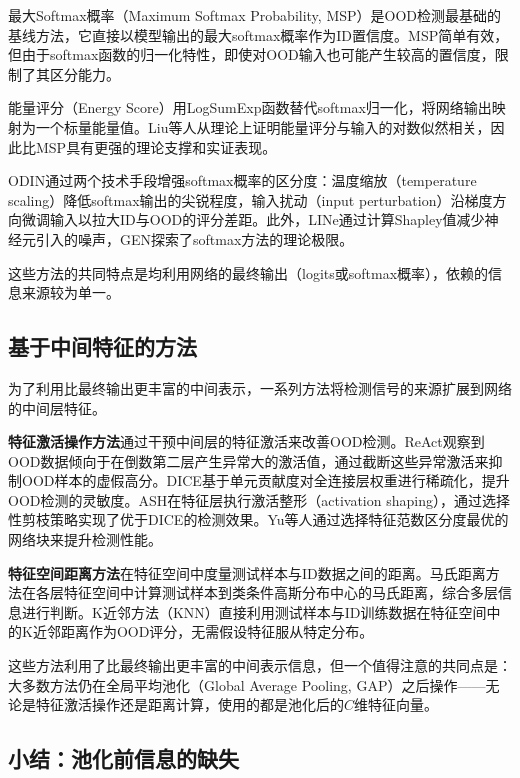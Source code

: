 最大Softmax概率（Maximum Softmax Probability, MSP）\cite{hendrycks2016msp}是OOD检测最基础的基线方法，它直接以模型输出的最大softmax概率作为ID置信度。MSP简单有效，但由于softmax函数的归一化特性，即使对OOD输入也可能产生较高的置信度，限制了其区分能力。

能量评分（Energy Score）\cite{liu2020energy}用LogSumExp函数替代softmax归一化，将网络输出映射为一个标量能量值。Liu等人\cite{liu2020energy}从理论上证明能量评分与输入的对数似然相关，因此比MSP具有更强的理论支撑和实证表现。

ODIN\cite{liang2018odin_confi}通过两个技术手段增强softmax概率的区分度：温度缩放（temperature scaling）降低softmax输出的尖锐程度，输入扰动（input perturbation）沿梯度方向微调输入以拉大ID与OOD的评分差距。此外，LINe\cite{ahn2023line}通过计算Shapley值减少神经元引入的噪声，GEN\cite{liu2023gen}探索了softmax方法的理论极限。

这些方法的共同特点是均利用网络的最终输出（logits或softmax概率），依赖的信息来源较为单一。

\subsection{基于中间特征的方法}

为了利用比最终输出更丰富的中间表示，一系列方法将检测信号的来源扩展到网络的中间层特征。

\textbf{特征激活操作方法}通过干预中间层的特征激活来改善OOD检测。ReAct\cite{sun2021react}观察到OOD数据倾向于在倒数第二层产生异常大的激活值，通过截断这些异常激活来抑制OOD样本的虚假高分。DICE\cite{sun2022dice}基于单元贡献度对全连接层权重进行稀疏化，提升OOD检测的灵敏度。ASH\cite{djurisic2022extremely}在特征层执行激活整形（activation shaping），通过选择性剪枝策略实现了优于DICE的检测效果。Yu等人\cite{yu2023block}通过选择特征范数区分度最优的网络块来提升检测性能。

\textbf{特征空间距离方法}在特征空间中度量测试样本与ID数据之间的距离。马氏距离方法\cite{lee2018maha_dist}在各层特征空间中计算测试样本到类条件高斯分布中心的马氏距离，综合多层信息进行判断。K近邻方法（KNN）\cite{sun2022knn}直接利用测试样本与ID训练数据在特征空间中的K近邻距离作为OOD评分，无需假设特征服从特定分布。

这些方法利用了比最终输出更丰富的中间表示信息，但一个值得注意的共同点是：大多数方法仍在全局平均池化（Global Average Pooling, GAP）之后操作——无论是特征激活操作还是距离计算，使用的都是池化后的$C$维特征向量。

\subsection{小结：池化前信息的缺失}

